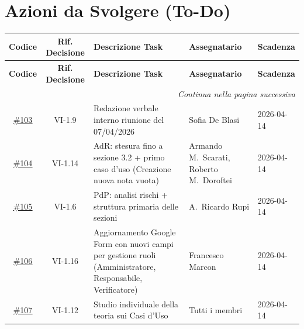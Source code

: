 
\section{Azioni da Svolgere (To-Do)}

\renewcommand{\arraystretch}{1.3}
\begin{longtable}{c c p{4.5cm} p{3cm} l}
	\toprule
	\textbf{Codice} & \textbf{Rif. Decisione} & \textbf{Descrizione Task} & \textbf{Assegnatario} & \textbf{Scadenza} \\
	\midrule
	\endfirsthead
 
	\toprule
	\textbf{Codice} & \textbf{Rif. Decisione} & \textbf{Descrizione Task} & \textbf{Assegnatario} & \textbf{Scadenza} \\
	\midrule
	\endhead
 
	\midrule
	\multicolumn{5}{r}{\textit{Continua nella pagina successiva}} \\
	\midrule
	\endfoot
 
	\bottomrule
	\endlastfoot
 
	\href{https://github.com/Synergo-Unit-UniPD/Second-Brain/issues/103}{\underline{\#103}} & VI-1.9 & Redazione verbale interno riunione del 07/04/2026 & Sofia De Blasi & 2026-04-14 \\[4pt]
	\href{https://github.com/Synergo-Unit-UniPD/Second-Brain/issues/104}{\underline{\#104}} & VI-1.14 & AdR: stesura fino a sezione 3.2 + primo caso d'uso (Creazione nuova nota vuota) & Armando M.\ Scarati, Roberto M.\ Doroftei & 2026-04-14 \\[4pt]
	\href{https://github.com/Synergo-Unit-UniPD/Second-Brain/issues/105}{\underline{\#105}} & VI-1.6 & PdP: analisi rischi + struttura primaria delle sezioni & A.\ Ricardo Rupi & 2026-04-14 \\[4pt]
	\href{https://github.com/Synergo-Unit-UniPD/Second-Brain/issues/106}{\underline{\#106}} & VI-1.16 & Aggiornamento Google Form con nuovi campi per gestione ruoli (Amministratore, Responsabile, Verificatore) & Francesco Marcon & 2026-04-14 \\[4pt]
	\href{https://github.com/Synergo-Unit-UniPD/Second-Brain/issues/107}{\underline{\#107}} & VI-1.12 & Studio individuale della teoria sui Casi d'Uso & Tutti i membri & 2026-04-14 \\
\end{longtable}

